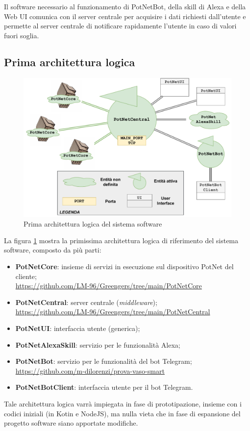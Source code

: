 Il software necessario al funzionamento di PotNetBot, della skill di Alexa e della Web UI comunica con il server centrale per acquisire i dati richiesti dall'utente e permette al server centrale di notificare rapidamente l'utente in caso di valori fuori soglia. 

\subsection{Prima architettura logica}
\begin{figure}[h]
	\centering
	\includegraphics[width=\textwidth]{images/logical_arch.pdf}
	\caption{Prima architettura logica del sistema software}
	\label{fig:logical_arch}
\end{figure}

La figura \ref{fig:logical_arch} mostra la primissima architettura logica di riferimento del sistema software, composto da più parti:
\begin{itemize}
	\item \textbf{PotNetCore}: insieme di servizi in esecuzione sul dispositivo PotNet del cliente;\\
	\url{https://github.com/LM-96/Greengers/tree/main/PotNetCore}
	
	\item \textbf{PotNetCentral}: server centrale (\textit{middleware});\\
	\url{https://github.com/LM-96/Greengers/tree/main/PotNetCentral}
	\item \textbf{PotNetUI}: interfaccia utente (generica);
	
	\item \textbf{PotNetAlexaSkill}: servizio per le funzionalità Alexa;
	
	\item \textbf{PotNetBot}: servizio per le funzionalità del bot Telegram;\\
	\url{https://github.com/m-dilorenzi/prova-vaso-smart}
	
	\item \textbf{PotNetBotClient}: interfaccia utente per il bot Telegram.
\end{itemize}
Tale architettura logica varrà impiegata in fase di prototipazione, insieme con i codici iniziali (in Kotin e NodeJS), ma nulla vieta che in fase di espansione del progetto software siano apportate modifiche.

